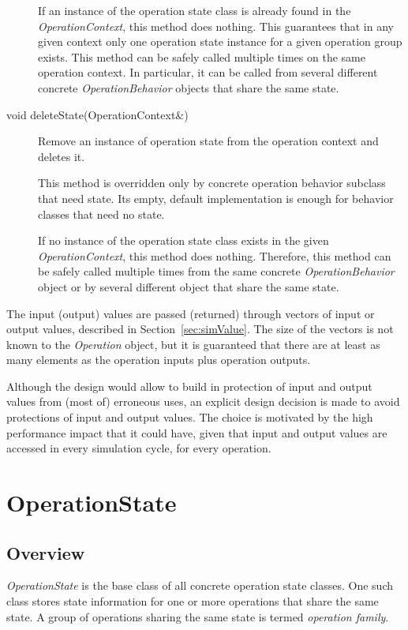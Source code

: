 \documentclass[a4paper,twoside]{tce}
\begin{document}
\begin{description}
  If an instance of the operation state class is already found in the
  \emph{OperationContext}, this method does nothing.  This guarantees that
  in any given context only one operation state instance for a given
  operation group exists.  This method can be safely called multiple times
  on the same operation context.  In particular, it can be called from
  several different concrete \emph{OperationBehavior} objects that share the
  same state.

\item[void deleteState(OperationContext\&)]%
  Remove an instance of operation state from the operation context and
  deletes it.

  This method is overridden only by concrete operation behavior subclass
  that need state.  Its empty, default implementation is enough for behavior
  classes that need no state.

  If no instance of the operation state class exists in the given
  \emph{OperationContext}, this method does nothing.  Therefore, this method
  can be safely called multiple times from the same concrete
  \emph{OperationBehavior} object or by several different object that share
  the same state.
\end{description}

The input (output) values are passed (returned) through vectors of input or
output values, described in Section~\ref{sec:simValue}.  The size of the
vectors is not known to the \emph{Operation} object, but it is guaranteed
that there are at least as many elements as the operation inputs plus
operation outputs.

Although the design would allow to build in protection of input and output
values from (most of) erroneous uses, an explicit design decision is made to
avoid protections of input and output values.  The choice is motivated by
the high performance impact that it could have, given that input and output
values are accessed in every simulation cycle, for every operation.

\section{OperationState}
\label{sec:operationState}

\subsection{Overview}

\emph{OperationState} is the base class of all concrete operation state
classes.  One such class stores state information for one or more operations
that share the same state.  A group of operations sharing the same state is
termed \emph{operation family}.
\end{document}
